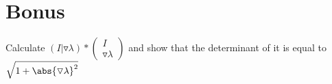 \section{Bonus}
\begin{question}
  Calculate $(I | \triangledown \lambda ) * \begin{pmatrix} I \\ \triangledown \lambda  \end{pmatrix} $ and show that the determinant of it is equal to $\sqrt{1+\abs{\triangledown \lambda }^2} $
\end{question}
\begin{solution}
\end{solution}
